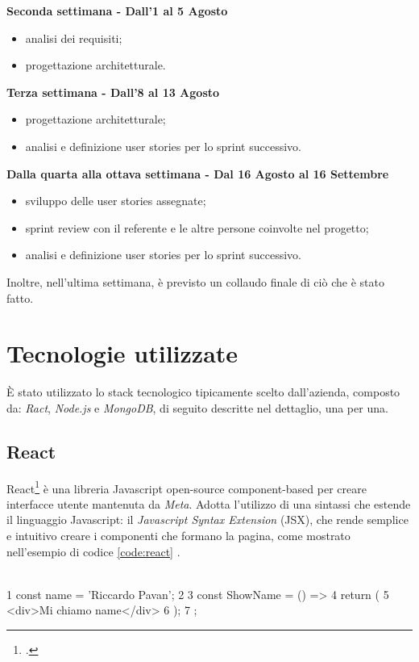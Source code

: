 \noindent\textbf{Seconda settimana - Dall'1 al 5 Agosto}

\begin{itemize}
  \item analisi dei requisiti;
  \item progettazione architetturale.
\end{itemize}

\noindent\textbf{Terza settimana - Dall'8 al 13 Agosto}

\begin{itemize}
  \item progettazione architetturale;
  \item analisi e definizione user stories per lo sprint successivo.
\end{itemize}

\noindent\textbf{Dalla quarta alla ottava settimana - Dal 16 Agosto al 16 Settembre}

\begin{itemize}
  \item sviluppo delle user stories assegnate;
  \item sprint review con il referente e le altre persone coinvolte nel progetto;
  \item analisi e definizione user stories per lo sprint successivo.
\end{itemize}

\noindent Inoltre, nell'ultima settimana, è previsto un collaudo finale di ciò che è stato fatto.

\section{Tecnologie utilizzate}

È stato utilizzato lo stack tecnologico tipicamente scelto dall'azienda, composto da: \emph{Ract}, \emph{Node.js} e \emph{MongoDB}, di seguito descritte nel dettaglio, una per una.

\subsection{React}

React\footcite{site:react} è una libreria Javascript open-source component-based per creare interfacce utente mantenuta da \emph{Meta}. Adotta l'utilizzo di una sintassi che estende il linguaggio Javascript: il \emph{Javascript Syntax Extension} (JSX), che rende semplice e intuitivo creare i componenti che formano la pagina, come mostrato nell'esempio di codice \ref{code:react} .\\
\begin{code}[frame=tb, label={code:react}, caption={Esempio di utilizzo di codice JSX}]\\  
1  const name = 'Riccardo Pavan';
2
3  const ShowName = () => {
4    return (
5      <div>Mi chiamo {name}</div>
6    );
7  };

\end{code}

